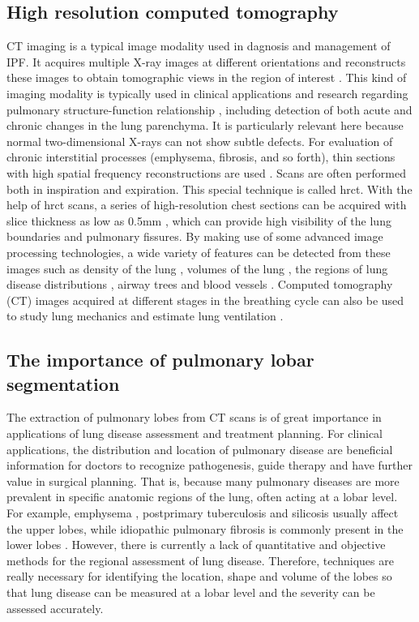 \subsection{High resolution computed tomography}
CT imaging is a typical image modality used in dagnosis and management of IPF. It acquires multiple X-ray images at different orientations and reconstructs these images to obtain tomographic views in the region of interest \citep{zhang2011medical}. This kind of imaging modality is typically used in clinical applications and research regarding pulmonary structure-function relationship \citep{hoffman1997assessment}, including detection of both acute and chronic changes in the lung parenchyma. It is particularly relevant here because normal two-dimensional X-rays can not show subtle  defects. For evaluation of chronic interstitial processes (emphysema, fibrosis, and so forth), thin sections with high spatial frequency reconstructions are used \citep{coxson2007computed}. Scans are often performed both in inspiration and expiration. This special technique is called \gls{hrct}. With the help of \gls{hrct} scans, a series of high-resolution chest sections can be acquired with slice thickness as low as 0.5mm \citep{naidich2005imaging}, which can provide high visibility of the lung boundaries and pulmonary fissures.  By making use of some advanced image processing technologies, a wide variety of features can be detected from these images such as density of the lung \citep{coxson2007computed}, volumes of the lung \citep{hu2001automatic}, the regions of lung disease distributions \citep{el2013computer, ley2008quantitative}, airway trees \citep{graham2010robust, zhu2010automatic, diaz2010airway} and blood vessels \citep{shikata2009segmentation}. Computed tomography (CT) images acquired at different stages in the breathing cycle can also be used to study lung mechanics and estimate lung ventilation \citep{hoffman2006state, yamamoto2011investigation}.

\subsection{The importance of pulmonary lobar segmentation}
The extraction of pulmonary lobes from CT scans is of great importance in applications of lung disease assessment and treatment planning. For clinical applications, the distribution and location of pulmonary disease are beneficial information for doctors to recognize pathogenesis, guide therapy and have further value in surgical planning. That is, because many pulmonary diseases are more prevalent in specific anatomic regions of the lung, often acting at a lobar level. For example, emphysema \citep{jeffery1998structural}, postprimary tuberculosis \citep{leung1999pulmonary} and silicosis \citep{rees2007silica} usually affect the upper lobes, while idiopathic pulmonary fibrosis is commonly present in the lower lobes \citep{lin2015combined}. However, there is currently a lack of quantitative and objective methods for the regional assessment of lung disease. Therefore, techniques are really necessary for identifying the location, shape and volume of the lobes so that lung disease can be measured at a lobar level and the severity can be assessed accurately.

